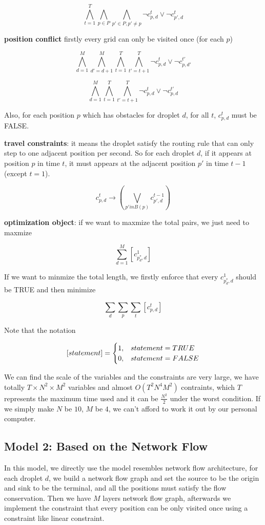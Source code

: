 \documentclass[twocolumn]{article}
\begin{document}
\[
\bigwedge_{t=1}^{T} \bigwedge_{p \in P} \bigwedge_{p' \in P, p' \neq p} \neg c_{p, d}^t \vee \neg c_{p', d}^t
\]

\textbf{position conflict} firstly every grid can only be visited once (for each $p$)

\[
\bigwedge_{d=1}^{M} \bigwedge_{d'=d+1}^{M} \bigwedge_{t=1}^{T}  \bigwedge_{t'=t+1}^{T} \neg c_{p, d}^t \vee \neg c_{p, d'}^{t'}
\]

\[
\bigwedge_{d=1}^{M} \bigwedge_{t=1}^{T}  \bigwedge_{t'=t+1}^{T} \neg c_{p, d}^t \vee \neg c_{p, d}^{t'}
\]

Also, for each position $p$ which has obstacles for droplet $d$, for all $t$, $c_{p, d}^t$ must be FALSE.

\textbf{travel constraints}: it means the droplet satisfy the routing rule that can only step to one adjacent position per second. So for each droplet $d$, if it appears at position $p$ in time $t$, it must appears at the adjacent position $p'$ in time $t-1$ (except $t=1$).

\[
c_{p, d}^t \to (\bigvee_{p' in B(p)} c_{p', d}^{t-1})
\]

\textbf{optimization object}: if we want to maxmize the total pairs, we just need to maxmize

\[
\sum_{d=1}^{M}{[c_{p^*_d,d}^1]}
\]

If we want to minmize the total length, we firstly enforce that every $c_{p^*_d,d}^1$ should be TRUE and then minimize

\[
\sum_{d}\sum_{p}\sum_{t}{[c_{p,d}^t]}
\]

Note that the notation

\[
[statement] = \begin{cases} 1, &statement = TRUE\cr 0, &statement = FALSE\end{cases}
\]

We can find the scale of the variables and the constraints are very large, we have totally $T \times N^2 \times M^2$ variables and almost $O(T^2 N^4 M^2)$ contraints, which $T$ represents the maximum time used and it can be $\frac{N^2}{2}$ under the worst condition. If we simply make $N$ be $10$, $M$ be $4$, we can't afford to work it out by our personal computer.

\subsection{Model 2: Based on the Network Flow}

In this model, we directly use the model resembles network flow architecture, for each droplet $d$, we build a network flow graph and set the source to be the origin and sink to be the terminal, and all the positions must satisfy the flow conservation. Then we have $M$ layers network flow graph, afterwards we implement the constraint that every position can be only visited once using a constraint like linear constraint.
\end{document}
